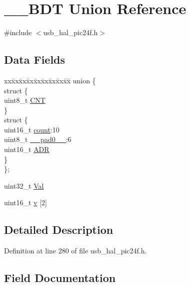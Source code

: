 \hypertarget{union_____b_d_t}{}\section{\+\_\+\+\_\+\+B\+DT Union Reference}
\label{union_____b_d_t}


{\ttfamily \#include $<$usb\+\_\+hal\+\_\+pic24f.\+h$>$}

\subsection*{Data Fields}
\begin{DoxyCompactItemize}
\item 
\begin{tabbing}
xx\=xx\=xx\=xx\=xx\=xx\=xx\=xx\=xx\=\kill
union \{\\
\>struct \{\\
\>\>uint8\_t \mbox{\hyperlink{union_____b_d_t_a8dcbbc96a681e9aec7bcee3ba3a93254}{CNT}}\\
\>\} \\
\>struct \{\\
\>\>uint16\_t \mbox{\hyperlink{union_____b_d_t_af6a39bfc7e1dc3b6f9c997c1c43fa996}{count}}:10\\
\>\>uint8\_t \mbox{\hyperlink{union_____b_d_t_a8b4eebe79ded0459acec2f4950102ba3}{\_\_pad0\_\_}}:6\\
\>\>uint16\_t \mbox{\hyperlink{union_____b_d_t_abb5ea3cb20903a76af1e03bb35b36d29}{ADR}}\\
\>\} \\
\}; \\

\end{tabbing}\item 
uint32\+\_\+t \mbox{\hyperlink{union_____b_d_t_a4497b7ccdd35adfe3656ecc961faad01}{Val}}
\item 
uint16\+\_\+t \mbox{\hyperlink{union_____b_d_t_ad3333479e5f03245d832c5d7e29f313f}{v}} \mbox{[}2\mbox{]}
\end{DoxyCompactItemize}


\subsection{Detailed Description}


Definition at line 280 of file usb\+\_\+hal\+\_\+pic24f.\+h.



\subsection{Field Documentation}
\mbox{\label{union_____b_d_t_a74e4a7ec80b721b115c1d223f67d8161}} 
